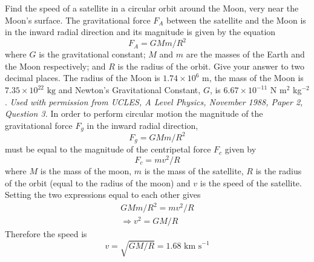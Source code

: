 \begin{hint}
{Find the speed of a satellite in a circular orbit around the Moon, very near the Moon's surface. %
The gravitational force $F_A$ between the satellite and the Moon is in the inward radial direction and its magnitude is given by the equation 
\begin{equation*}
F_A=GMm/R^2
\end{equation*}
where $G$ is the gravitational constant; $M$ and $m$ are the masses of the Earth and the Moon respectively; and $R$ is the radius of the orbit. Give your answer to two decimal places.
}  %
{The radius of the Moon is $1.74\times 10^6\textrm{ m}$, the mass of the Moon is $7.35\times 10^{22}\textrm{ kg}$ and Newton's Gravitational Constant, $G$, is $6.67 \times 10^{-11}$ N m$^{2}$ kg$^{-2}$.}
{\textit{Used with permission from UCLES, A Level Physics, November 1988, Paper 2, Question 3.}}
{In order to perform circular motion the magnitude of the gravitational force $F_g$ in the inward radial direction, 
\begin{equation*} F_g=GMm/R^2 \end{equation*}
must be equal to the magnitude of the centripetal force $F_c$ given by 
\begin{equation*} F_c=mv^2/R \end{equation*}
where $M$ is the mass of the moon, $m$ is the mass of the satellite, $R$ is the radius of the orbit (equal to the radius of the moon) and $v$ is the speed of the satellite. Setting the two expressions equal to each other gives
\begin{align*} GMm/R^2=mv^2/R \\ \Rightarrow v^2=GM/R \end{align*}
Therefore the speed is 
\begin{equation*} v=\sqrt{GM/R}=1.68\textrm{ km s}^{-1} \end{equation*} 
}
\end{hint}